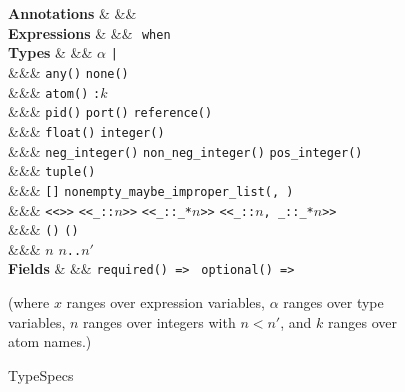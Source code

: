 \begin{figure} [H]
   \begin{grammarfig}
      \textbf{Annotations} & \FWA &\bnfeq& 
      \TSAn 
      \\
      \textbf{Expressions} & \TSE &\bnfeq& 
      \TSFn{\ov{\TST}}{\TST} \bnfor 
      \TSFn{\ov{\TST}}{\TST}\,\,\texttt{when}\,\,\ov{\texttt{$\alpha$:}\,\TST}
      \\[2mm]
      \textbf{Types} & \TST &\bnfeq&
      \texttt{$\alpha$} \bnfor \texttt{\TST|\TST} 
      \\ &&\bnfor& \texttt{any()} \bnfor \texttt{none()}
      \\ &&\bnfor& \texttt{atom()} \bnfor \texttt{:$k$}
      \\ &&\bnfor& \texttt{pid()} \bnfor \texttt{port()} \bnfor \texttt{reference()}
      \\ &&\bnfor& \texttt{float()} \bnfor \texttt{integer()} 
      \\ &&\bnfor& \texttt{neg\_integer()} \bnfor \texttt{non\_neg\_integer()} \bnfor \texttt{pos\_integer()}
      \\ &&\bnfor& \texttt{tuple()} \bnfor \tuple{\ov{\TST}} \bnfor \map{\ov{\TSF}} 
      \\ &&\bnfor& \texttt{[]} \bnfor \texttt{nonempty\_maybe\_improper\_list(\TST, \TST)} 
      \\ &&\bnfor& \texttt{<<>>} \bnfor \texttt{<<\_::$n$>>} \bnfor \texttt{<<\_::\_*$n$>>} \bnfor \texttt{<<\_::$n$, \_::\_*$n$>>}
      \\ &&\bnfor& \texttt{(\fun{$\ov{\TST}$}{\TST})} \bnfor \texttt{()}
      \\ &&\bnfor& \texttt{$n$} \bnfor \texttt{$n$..$n'$}
      \\
      \textbf{Fields} & \TSF &\bnfeq&
      \texttt{required(\TST)\,=>\,\TST} \bnfor \texttt{optional(\TST)\,=>\,\TST}
      \end{grammarfig}
   \small(where $x$ ranges over expression variables, $\alpha$ ranges over type variables, 
   $n$ ranges over integers with $n<n'$, and $k$ ranges over atom names.)
   \caption{TypeSpecs}
   \label{app:typespecs-syntax}
\end{figure}